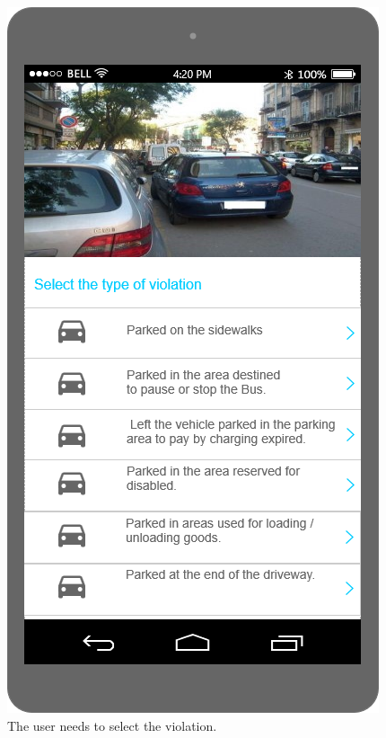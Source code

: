 \documentclass[./main.tex]{subfiles}
\begin{document}
\begin{figure}
    \hfill
    \begin{minipage}[t]{\mockupdimension}
        \includegraphics[width=\textwidth]{resources/Mockups/select_violation}
        \caption{The user needs to select the violation.}
        \label{fig:select_violation}
    \end{minipage}
\end{figure}
\end{document}
